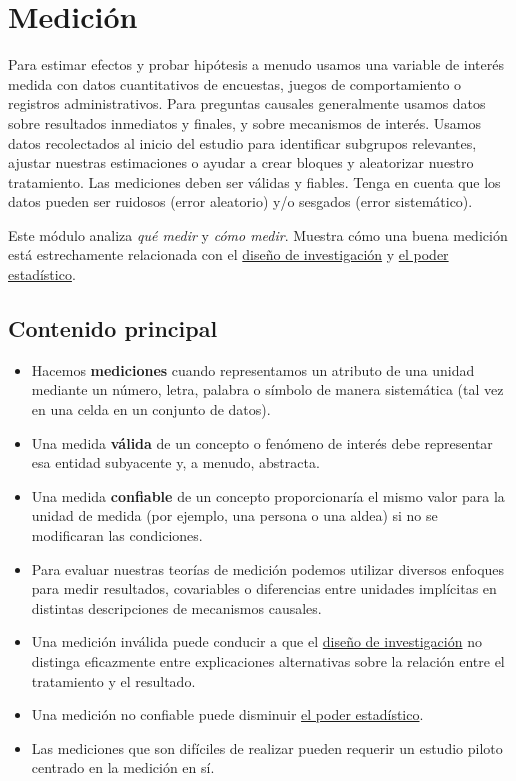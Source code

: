\documentclass[12pt,spanish,]{book}
\begin{document}
\hypertarget{mediciuxf3n}{%
\chapter{Medición}\label{mediciuxf3n}}

Para estimar efectos y probar hipótesis a menudo usamos una variable de interés medida con datos cuantitativos de encuestas, juegos de comportamiento o registros administrativos. Para preguntas causales generalmente usamos datos sobre resultados inmediatos y finales, y sobre mecanismos de interés. Usamos datos recolectados al inicio del estudio para identificar subgrupos relevantes, ajustar nuestras estimaciones o ayudar a crear bloques y aleatorizar nuestro tratamiento. Las mediciones deben ser válidas y fiables. Tenga en cuenta que los datos pueden ser ruidosos (error aleatorio) y/o sesgados (error sistemático).

Este módulo analiza \emph{qué medir} y \emph{cómo medir}. Muestra cómo una buena medición está estrechamente relacionada con el \href{https://egap.github.io/learningdays-resources/Exercises/design-form.Rmd}{diseño de investigación} y \href{poder-estadístico-y-diagnosticandos-del-diseño.html}{el poder estadístico}.

\hypertarget{contenido-principal-6}{%
\section{Contenido principal}\label{contenido-principal-6}}

\begin{itemize}
\item
  Hacemos \textbf{mediciones} cuando representamos un atributo de una unidad mediante un número, letra, palabra o símbolo de manera sistemática (tal vez en una celda en un conjunto de datos).
\item
  Una medida \textbf{válida} de un concepto o fenómeno de interés debe representar esa entidad subyacente y, a menudo, abstracta.
\item
  Una medida \textbf{confiable} de un concepto proporcionaría el mismo valor para la unidad de medida (por ejemplo, una persona o una aldea) si no se modificaran las condiciones.
\item
  Para evaluar nuestras teorías de medición podemos utilizar diversos enfoques para medir resultados, covariables o diferencias entre unidades implícitas en distintas descripciones de mecanismos causales.
\item
  Una medición inválida puede conducir a que el \href{https://egap.github.io/learningdays-resources/Exercises/design-form.Rmd}{diseño de investigación} no distinga eficazmente entre explicaciones alternativas sobre la relación entre el tratamiento y el resultado.
\item
  Una medición no confiable puede disminuir \href{statistical-power-and-design\%20-diagnosands.html}{el poder estadístico}.
\item
  Las mediciones que son difíciles de realizar pueden requerir un estudio piloto centrado en la medición en sí.
\end{itemize}
\end{document}
